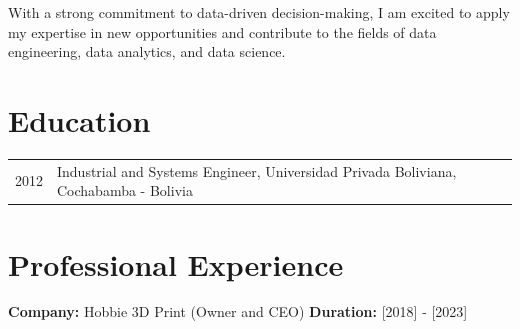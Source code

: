\documentclass[a4paper,10pt]{article}
\begin{document}
With a strong commitment to data-driven decision-making, I am excited to apply my expertise in new opportunities and contribute to the fields of data engineering, data analytics, and data science.

\section*{Education}
\begin{tabular}{p{3cm}p{12cm}}
    2012 & Industrial and Systems Engineer, Universidad Privada Boliviana, Cochabamba - Bolivia \\
\end{tabular}

\section*{Professional Experience}
\textbf{Company:} Hobbie 3D Print (Owner and CEO)  
\textbf{Duration:} [2018] - [2023]
\end{document}
